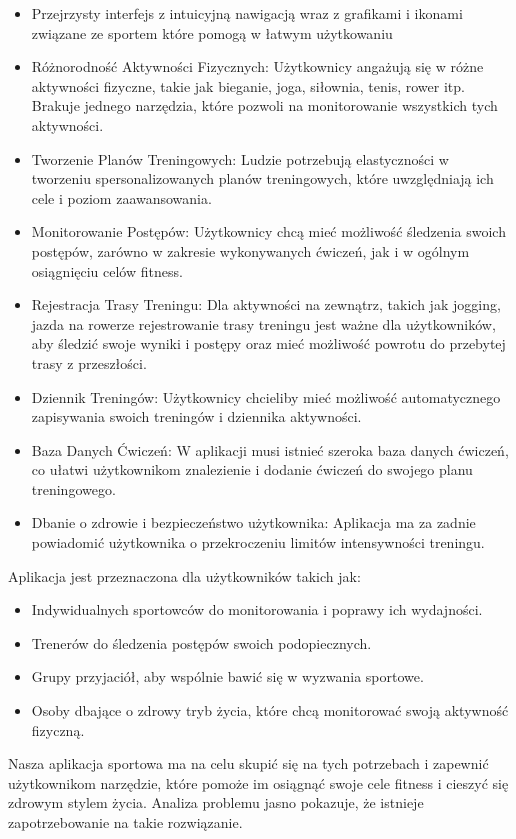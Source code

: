 \begin{itemize}
    \item Przejrzysty interfejs z intuicyjną nawigacją wraz z grafikami i ikonami związane ze sportem które pomogą w łatwym użytkowaniu
    
    \item Różnorodność Aktywności Fizycznych: Użytkownicy angażują się w różne aktywności fizyczne, takie jak bieganie, joga, siłownia, tenis, rower itp. Brakuje jednego narzędzia, które pozwoli na monitorowanie wszystkich tych aktywności.

    \item Tworzenie Planów Treningowych: Ludzie potrzebują elastyczności w tworzeniu spersonalizowanych planów treningowych, które uwzględniają ich cele i poziom zaawansowania.

    \item Monitorowanie Postępów: Użytkownicy chcą mieć możliwość śledzenia swoich postępów, zarówno w zakresie wykonywanych ćwiczeń, jak i w ogólnym osiągnięciu celów fitness.

    \item Rejestracja Trasy Treningu: Dla aktywności na zewnątrz, takich jak jogging, jazda na rowerze rejestrowanie trasy treningu jest ważne dla użytkowników, aby śledzić swoje wyniki i postępy oraz mieć możliwość powrotu do przebytej trasy z przeszłości.

    \item Dziennik Treningów: Użytkownicy chcieliby mieć możliwość automatycznego zapisywania swoich treningów i dziennika aktywności.

    \item Baza Danych Ćwiczeń: W aplikacji musi istnieć szeroka baza danych ćwiczeń, co ułatwi użytkownikom znalezienie i dodanie ćwiczeń do swojego planu treningowego.

    \item Dbanie o zdrowie i bezpieczeństwo użytkownika: Aplikacja ma za zadnie powiadomić użytkownika o przekroczeniu limitów intensywności treningu. 
\end{itemize}
Aplikacja jest przeznaczona dla użytkowników takich jak:
\begin{itemize}
    \item Indywidualnych sportowców do monitorowania i poprawy ich wydajności.
    \item Trenerów do śledzenia postępów swoich podopiecznych.
    \item Grupy przyjaciół, aby wspólnie bawić się w wyzwania sportowe.
    \item Osoby dbające o zdrowy tryb życia, które chcą monitorować swoją aktywność fizyczną.
\end{itemize}
Nasza aplikacja sportowa ma na celu skupić się na tych potrzebach i zapewnić użytkownikom narzędzie, które pomoże im osiągnąć swoje cele fitness i cieszyć się zdrowym stylem życia. Analiza problemu jasno pokazuje, że istnieje zapotrzebowanie na takie rozwiązanie.

